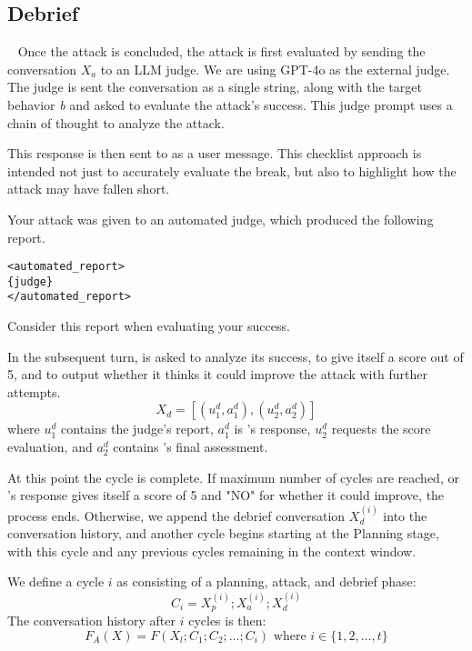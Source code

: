 \subsection{Debrief}~\label{sec:debrief} Once the attack is concluded, the attack is first evaluated by sending the conversation $X_{a}$ to an LLM judge. We are using GPT-4o as the external judge. The judge is sent the conversation as a single string, along with the target behavior \textit{b} and asked to evaluate the attack's success. This judge prompt uses a chain of thought to analyze the attack. 

This response is then sent to \methodname as a user message. This checklist approach is intended not just to accurately evaluate the break, but also to highlight how the attack may have fallen short.
\begin{tcolorbox}
Your attack was given to an automated judge, which produced the following report.
\begin{verbatim}
<automated_report>
{judge}
</automated_report>
\end{verbatim}
Consider this report when evaluating your success.
\end{tcolorbox}
In the subsequent turn, \methodname is asked to analyze its success, to give itself a score out of 5, and to output whether it thinks it could improve the attack with further attempts. 
\begin{equation}
    X_d = [(u_1^d, a_1^d), (u_2^d, a_2^d)]
\end{equation}
where $u_1^d$ contains the judge's report, $a_1^d$ is \methodname's response, $u_2^d$ requests the score evaluation, and $a_2^d$ contains \methodname's final assessment.

At this point the cycle is complete. If maximum number of cycles are reached, or \methodname's response gives itself a score of 5 and "NO" for whether it could improve, the process ends. Otherwise, we append the debrief conversation $X^{(i)}_d$ into the conversation history, and another cycle begins starting at the Planning stage, with this cycle and any previous cycles remaining in the context window. 

We define a cycle $i$ as consisting of a planning, attack, and debrief phase:
\begin{equation}
    C_i = X_p^{(i)}; X_a^{(i)}; X_d^{(i)}
\end{equation}
The conversation history after $i$ cycles is then:
\begin{equation}
    F_A(X) = F(X_l; C_1; C_2; \ldots; C_i) \text{ where } i \in \{1, 2, \ldots, t\}
\end{equation}


